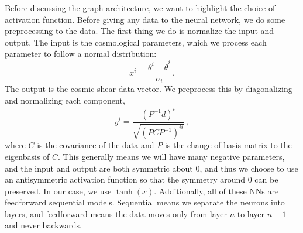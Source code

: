 Before discussing the graph architecture, we want to highlight the choice of activation function. Before giving any data to the neural network, we do some preprocessing to the data. The first thing we do is normalize the input and output. The input is the cosmological parameters, which we process each parameter to follow a normal distribution:
\begin{equation}
	x^i = \frac{\theta^i - \bar\theta^i}{\sigma_i}\,.
\end{equation}
The output is the cosmic shear data vector. We preprocess this by diagonalizing and normalizing each component,
\begin{equation}
	y^i = \frac{ (P^{-1}d)^i }{\sqrt{(PCP^{-1})^{ii}}}\,,
\end{equation}
where $C$ is the covariance of the data and $P$ is the change of basis matrix to the eigenbasis of $C$. This generally means we will have many negative parameters, and the input and output are both symmetric about 0, and thus we choose to use an antisymmetric activation function so that the symmetry around 0 can be preserved. In our case, we use $\tanh(x)$. Additionally, all of these NNs are feedforward sequential models. Sequential means we separate the neurons into layers, and feedforward means the data moves only from layer $n$ to layer $n+1$ and never backwards.
